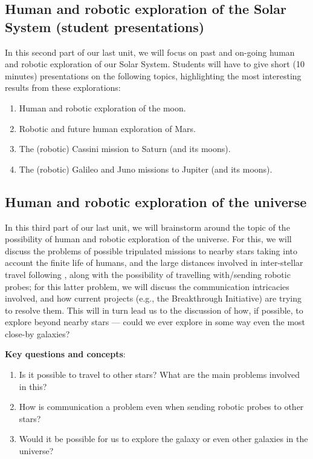 \documentclass{tufte-handout}
\begin{document}
\begin{fullwidth}
\subsection{Human and robotic exploration of the Solar System (student presentations)}
In this second part of our last unit, we will focus on past and on-going human and robotic exploration of our Solar System. 
Students will have to give short (10 minutes) presentations on the following topics, highlighting the most interesting results 
from these explorations:

\begin{enumerate}
\item Human and robotic exploration of the moon.
\item Robotic and future human exploration of Mars.
\item The (robotic) Cassini mission to Saturn (and its moons). 
\item The (robotic) Galileo and Juno missions to Jupiter (and its moons).
\end{enumerate}


\subsection{Human and robotic exploration of the universe}
In this third part of our last unit, we will brainstorm around the topic of the possibility of human and robotic exploration of the universe. 
For this, we will discuss the problems of possible tripulated missions to nearby stars taking into account the finite life of humans, and the 
large distances involved in inter-stellar travel following \citet{trip}, along with the possibility of travelling with/sending robotic probes; 
for this latter problem, we will discuss the communication intricacies involved, and how current projects (e.g., the Breakthrough Initiative) 
are trying to resolve them. This will in turn lead us to the discussion of how, if possible, to explore beyond nearby stars --- could we ever 
explore in some way even the most close-by galaxies?

\vspace{0.5 cm}
\noindent \textbf{Key questions and concepts}:
\begin{enumerate}
\item Is it possible to travel to other stars? What are the main problems involved in this?
\item How is communication a problem even when sending robotic probes to other stars?
\item Would it be possible for us to explore the galaxy or even other galaxies in the universe?
\end{enumerate}


\end{fullwidth}
\end{document}
